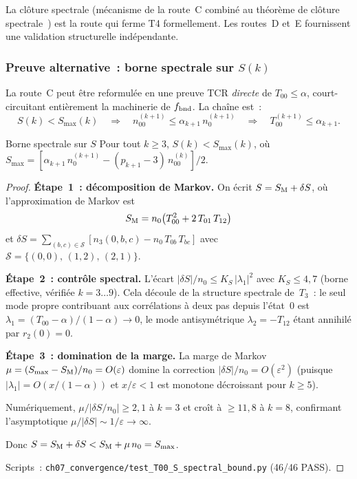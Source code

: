 \documentclass[12pt,a4paper]{article}
\begin{document}
\medskip\noindent
La clôture spectrale (mécanisme de la route~C combiné au théorème de
clôture spectrale~\cite{companion_M3}) est la route qui ferme T4
formellement. Les routes~D et~E fournissent une validation
structurelle indépendante.

\subsubsection{Preuve alternative~: borne spectrale sur $S(k)$}
\label{sec:ch7b_S_spectral_bound}

La route~C peut être reformulée en une preuve TCR \emph{directe} de
$T_{00} \leq \alpha$, court-circuitant entièrement la machinerie de
$f_{\rm bnd}$. La chaîne est~:
\[
  S(k) < S_{\max}(k)
  \quad\Longrightarrow\quad
  n_{00}^{(k+1)} \leq \alpha_{k+1}\,n_0^{(k+1)}
  \quad\Longrightarrow\quad
  T_{00}^{(k+1)} \leq \alpha_{k+1}.
\]

\begin{thmbox}{Borne spectrale sur $S$}
\label{thm:S_spectral_bound}
Pour tout $k \geq 3$, $S(k) < S_{\max}(k)$, où
$S_{\max} = [\alpha_{k+1}\,n_0^{(k+1)} - (p_{k+1}-3)\,n_{00}^{(k)}]/2$.

\begin{proof}
\textbf{Étape~1~: décomposition de Markov.}
On écrit $S = S_{\rm M} + \delta S$, où l'approximation de Markov
est
\[
  S_{\rm M} = n_0\bigl(T_{00}^2 + 2\,T_{01}\,T_{12}\bigr)
\]
et
$\delta S = \sum_{(b,c)\in\mathcal{S}} [n_3(0,b,c) - n_0\,T_{0b}\,T_{bc}]$
avec $\mathcal{S} = \{(0,0),\,(1,2),\,(2,1)\}$.

\textbf{Étape~2~: contrôle spectral.}
L'écart $|\delta S|/n_0 \leq K_S\,|\lambda_1|^2$ avec
$K_S \leq 4{,}7$ (borne effective, vérifiée $k = 3\ldots 9$). Cela
découle de la structure spectrale de~$T_3$~: le seul mode propre
contribuant aux corrélations à deux pas depuis l'état~$0$ est
$\lambda_1 = (T_{00}-\alpha)/(1-\alpha) \to 0$, le mode
antisymétrique $\lambda_2 = -T_{12}$ étant annihilé par
$r_2(0) = 0$.

\textbf{Étape~3~: domination de la marge.}
La marge de Markov
$\mu = (S_{\max} - S_{\rm M})/n_0 = O(\varepsilon)$
domine la correction $|\delta S|/n_0 = O(\varepsilon^2)$
(puisque $|\lambda_1| = O(x/(1{-}\alpha))$ et
$x/\varepsilon < 1$ est monotone décroissant pour $k \geq 5$).

Numériquement, $\mu/|\delta S/n_0| \geq 2{,}1$ à $k = 3$ et croît
à $\geq 11{,}8$ à $k = 8$, confirmant l'asymptotique
$\mu/|\delta S| \sim 1/\varepsilon \to \infty$.

Donc $S = S_{\rm M} + \delta S < S_{\rm M} + \mu\,n_0 = S_{\max}$.

Scripts~: \texttt{ch07\_convergence/test\_T00\_S\_spectral\_bound.py}
(46/46 PASS).
\end{proof}
\end{thmbox}
\end{document}
